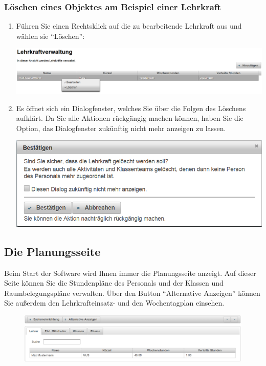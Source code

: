 \documentclass[fontsize=12pt]{scrartcl}
\begin{document}
\subsubsection{Löschen eines Objektes am Beispiel einer Lehrkraft}
\begin{enumerate}
\item Führen Sie einen Rechtsklick auf die zu bearbeitende Lehrkraft aus und wählen sie "`Löschen"': \medskip\\
	\begin{minipage}[t]{\linewidth}
            \includegraphics[width=1\linewidth]{images/editTeacher.png}
    \end{minipage}
\item Es öffnet sich ein Dialogfenster, welches Sie über die Folgen des Löschens aufklärt. Da Sie alle Aktionen rückgängig machen können, haben Sie die Option, das Dialogfenster zukünftig nicht mehr anzeigen zu lassen. \medskip\\
	\begin{minipage}[t]{\linewidth}
            \includegraphics[width=.8\linewidth]{images/confirmDialog.png}
    \end{minipage} 
\end{enumerate}

\subsection{Die Planungsseite}
Beim Start der Software wird Ihnen immer die Planungsseite anzeigt. Auf dieser Seite können Sie die Stundenpläne des Personals und der Klassen und Raumbelegungspläne verwalten. Über den Button "`Alternative Anzeigen"' können Sie außerdem den Lehrkrafteinsatz- und den Wochentagplan einsehen.

\begin{figure}[H]
\centering
\includegraphics[width=\textwidth]{images/planningPage.png}
\end{figure}
\end{document}
